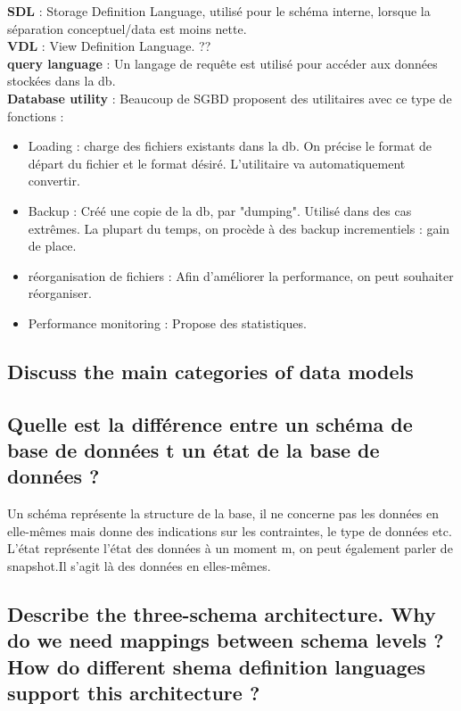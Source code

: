 \textbf{SDL} : Storage Definition Language, utilisé pour le schéma interne, lorsque la séparation conceptuel/data est moins nette.\\
\textbf{VDL} : View Definition Language. ?? \\
\textbf{query language} : Un langage de requête est utilisé pour accéder aux données stockées dans la db. \\
\textbf{Database utility} : 
Beaucoup de SGBD proposent des utilitaires avec ce type de fonctions :
\begin{itemize}
	\item Loading : charge des fichiers existants dans la db. On précise le 
	format de départ du fichier et le format désiré. L'utilitaire 
	va automatiquement convertir. 
	 \item Backup : Créé une copie de la db, par "dumping". Utilisé dans des 
	 cas extrêmes. La plupart du temps, on procède à des backup incrementiels : gain de place.
	 \item réorganisation de fichiers : Afin d'améliorer la performance, on peut souhaiter réorganiser.
	 \item Performance monitoring : Propose des statistiques.
\end{itemize}

\subsection{Discuss the main categories of data models}


\subsection{Quelle est la différence entre un schéma de base de données t  un état de la base de données ?}
Un schéma représente la structure de la base, il ne concerne pas les données 
en elle-mêmes mais donne des indications sur les contraintes, le type de données etc.
L'état représente l'état des données à un moment m, on 
peut également parler de snapshot.Il s'agit là des données en elles-mêmes.


\subsection{Describe the three-schema architecture. Why do we need mappings between schema levels ? How do different shema definition languages support this architecture ?}


